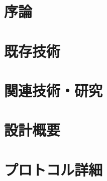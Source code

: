 \documentclass[12pt]{b-thesis}
\begin{document}
\title{}
\titleinenglish{}
\subteacher{}
\courseinenglish{}
\id{}
\author{}
\maketitle

\courseinenglish{}
\authorinenglish{}
\titleinenglish{}



\makejabstract

\clearpage


\setcounter{page}{1}

\tableofcontents
\thispagestyle{plain}

\listoffigures
\listoftables

\clearpage


\pagestyle{headings}
\setcounter{page}{1}

\clearpage

\chapter{序論}
\label{chap:introduction}


\chapter{既存技術}
\label{chap:existing_technology}


\chapter{関連技術・研究}
\label{chap:related_research}


\chapter{設計概要}
\label{chap:design}


\chapter{プロトコル詳細}
\label{chap:protocol}

\end{document}

